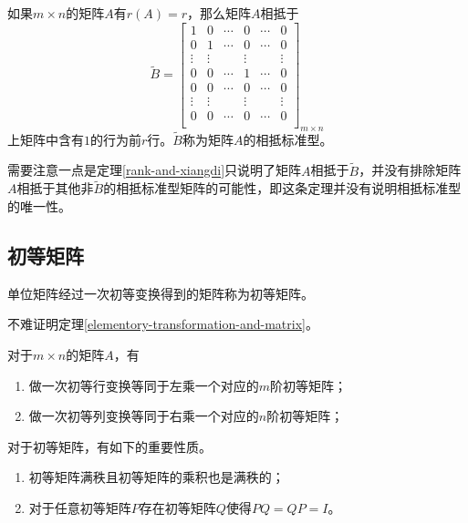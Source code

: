 \begin{thm}
    \label{rank-and-xiangdi}
    如果$m\times n$的矩阵$A$有$r(A)=r$，那么矩阵$A$相抵于
    $$
    \tilde{B}=\begin{bmatrix}
        1 & 0 & \cdots & 0 & \cdots & 0 \\
        0 & 1 & \cdots & 0 & \cdots & 0 \\
        \vdots & \vdots & & \vdots & & \vdots \\
        0 & 0 & \cdots & 1 & \cdots & 0 \\
        0 & 0 & \cdots & 0 & \cdots & 0 \\
        \vdots & \vdots & & \vdots & & \vdots \\
        0 & 0 & \cdots & 0 & \cdots & 0 \\
    \end{bmatrix}_{m\times n}
    $$
    上矩阵中含有$1$的行为前$r$行。$\tilde{B}$称为矩阵$A$的相抵标准型。
\end{thm}
需要注意一点是定理\ref{rank-and-xiangdi}只说明了矩阵$A$相抵于$\tilde{B}$，并没有排除矩阵$A$相抵于其他非$\tilde{B}$的相抵标准型矩阵的可能性，即这条定理并没有说明相抵标准型的唯一性。

\subsection{初等矩阵}

\begin{definition}
    \label{elementory-matrix}
    单位矩阵经过一次初等变换得到的矩阵称为初等矩阵。
\end{definition}

不难证明定理\ref{elementory-transformation-and-matrix}。

\begin{thm}
    \label{elementory-transformation-and-matrix}
    对于$m\times n$的矩阵$A$，有
    \begin{enumerate}
        \item 做一次初等行变换等同于左乘一个对应的$m$阶初等矩阵；
        \item 做一次初等列变换等同于右乘一个对应的$n$阶初等矩阵；
    \end{enumerate}
\end{thm}

对于初等矩阵，有如下的重要性质。

\begin{property}
    \label{elementory-matrix-property}
    \begin{enumerate}
        \item 初等矩阵满秩且初等矩阵的乘积也是满秩的；
        \item 对于任意初等矩阵$P$存在初等矩阵$Q$使得$PQ=QP=I$。
    \end{enumerate}
\end{property}

